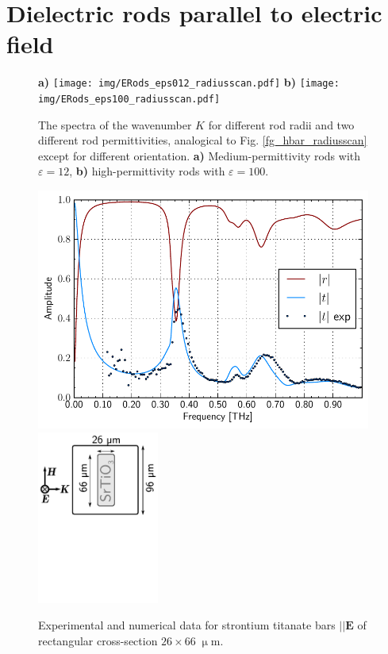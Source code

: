 \documentclass[letterpaper,12pt]{report}
\begin{document}
\section{Dielectric rods parallel to electric field}
\begin{figure}[ht] \caption{The spectra of the wavenumber $K$ for different rod radii and two different rod permittivities, analogical to Fig. \ref{fg_hbar_radiusscan} except for different orientation. \textbf{a)} Medium-permittivity rods with $\varepsilon = 12$, \textbf{b)} high-permittivity rods with $\varepsilon = 100$.  } \label{fg_ebar_radiusscan} \centering 
\textbf{a)}	\texttt{[image: img/ERods\_eps012\_radiusscan.pdf]}
\textbf{b)}	\texttt{[image: img/ERods\_eps100\_radiusscan.pdf]}
\end{figure}


\begin{figure}[ht] \caption{Experimental and numerical data for strontium titanate bars $||\mathbf E$ of rectangular cross-section $26 \times 66\;\upmu$m. }\label{fg_ebars_exp} \centering 
\includegraphics[width=11cm]{img/STObar_rt.pdf} 
\includegraphics[width=4cm]{img/EBars_STO_sketch.pdf}
\end{figure}
\end{document}
